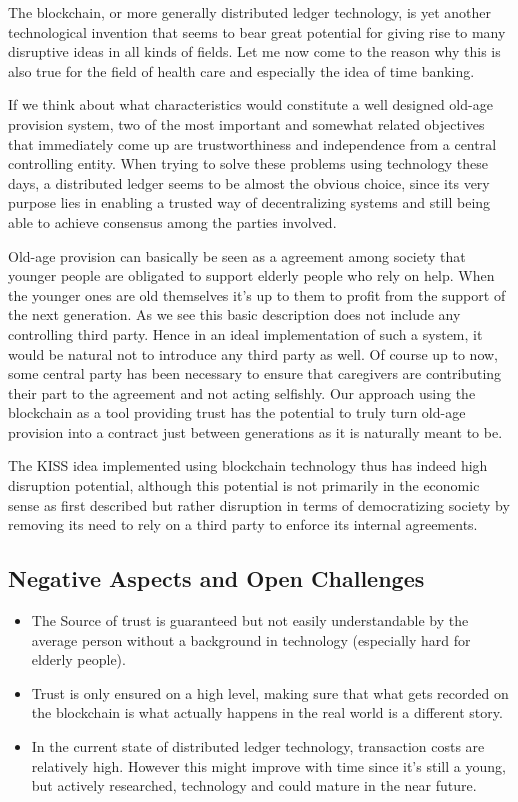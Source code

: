 \documentclass[12pt]{report}
\begin{document}
The blockchain, or more generally distributed ledger technology, is yet another technological invention that seems to bear great potential for giving rise to many disruptive ideas in all kinds of fields. Let me now come to the reason why this is also true for the field of health care and especially the idea of time banking.

If we think about what characteristics would constitute a well designed old-age provision system, two of the most important and somewhat related objectives that immediately come up are trustworthiness and independence from a central controlling entity. When trying to solve these problems using technology these days, a distributed ledger seems to be almost the obvious choice, since its very purpose lies in enabling a trusted way of decentralizing systems and still being able to achieve consensus among the parties involved.

Old-age provision can basically be seen as a agreement among society that younger people are obligated to support elderly people who rely on help. When the younger ones are old themselves it's up to them to profit from the support of the next generation. As we see this basic description does not include any controlling third party. Hence in an ideal implementation of such a system, it would be natural not to introduce any third party as well. Of course up to now, some central party has been necessary to ensure that caregivers are contributing their part to the agreement and not acting selfishly. Our approach using the blockchain as a tool providing trust has the potential to truly turn old-age provision into a contract just between generations as it is naturally meant to be.

The KISS idea implemented using blockchain technology thus has indeed high disruption potential, although this potential is not primarily in the economic sense as first described but rather disruption in terms of democratizing society by removing its need to rely on a third party to enforce its internal agreements.


\subsection{Negative Aspects and Open Challenges}
\begin{itemize}
    \item The Source of trust is guaranteed but not easily understandable by the average person without a background in technology (especially hard for elderly people).
    \item Trust is only ensured on a high level, making sure that what gets recorded on the blockchain is what actually happens in the real world is a different story.
    \item In the current state of distributed ledger technology, transaction costs are relatively high. However this might improve with time since it's still a young, but actively researched, technology and could mature in the near future.
\end{itemize}
\end{document}
